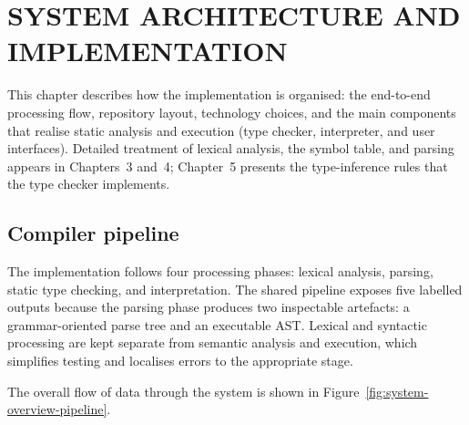 \chapter{SYSTEM ARCHITECTURE AND IMPLEMENTATION}

This chapter describes how the implementation is organised: the end-to-end
processing flow, repository layout, technology choices, and the main components
that realise static analysis and execution (type checker, interpreter, and user
interfaces). Detailed treatment of lexical analysis, the symbol table, and
parsing appears in Chapters~3 and~4; Chapter~5 presents the type-inference rules
that the type checker implements.

\section{Compiler pipeline}
The implementation follows four processing phases: lexical analysis, parsing,
static type checking, and interpretation. The shared pipeline exposes five
labelled outputs because the parsing phase produces two inspectable artefacts:
a grammar-oriented parse tree and an executable AST. Lexical and syntactic
processing are kept separate from semantic analysis and execution, which
simplifies testing and localises errors to the appropriate stage.

The overall flow of data through the system is shown in
Figure~\ref{fig:system-overview-pipeline}.

